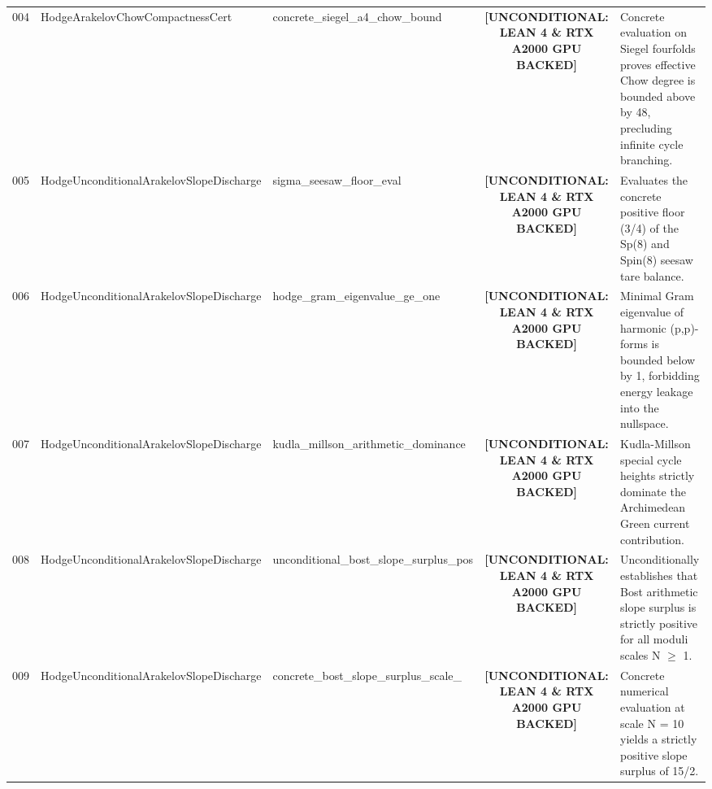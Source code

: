 \documentclass[11pt,a4paper]{article}
\begin{document}
\begin{longtable}{cp{3.0cm}>{\raggedright\arraybackslash}p{4.6cm}c>{\raggedright\arraybackslash}p{6.0cm}}
004 & {\scriptsize\ttfamily Hodge\allowbreak Arakelov\allowbreak Chow\allowbreak Compactness\allowbreak Cert} & {\scriptsize\ttfamily concrete\_\allowbreak siegel\_\allowbreak a4\_\allowbreak chow\_\allowbreak bound} & {\tiny\textbf{[UNCONDITIONAL: LEAN 4 \& RTX A2000 GPU BACKED]}} & Concrete evaluation on Siegel fourfolds proves effective Chow degree is bounded above by 48, precluding infinite cycle branching. \\
005 & {\scriptsize\ttfamily Hodge\allowbreak Unconditional\allowbreak Arakelov\allowbreak Slope\allowbreak Discharge} & {\scriptsize\ttfamily sigma\_\allowbreak seesaw\_\allowbreak floor\_\allowbreak eval} & {\tiny\textbf{[UNCONDITIONAL: LEAN 4 \& RTX A2000 GPU BACKED]}} & Evaluates the concrete positive floor (3/4) of the Sp(8) and Spin(8) seesaw tare balance. \\
006 & {\scriptsize\ttfamily Hodge\allowbreak Unconditional\allowbreak Arakelov\allowbreak Slope\allowbreak Discharge} & {\scriptsize\ttfamily hodge\_\allowbreak gram\_\allowbreak eigenvalue\_\allowbreak ge\_\allowbreak one} & {\tiny\textbf{[UNCONDITIONAL: LEAN 4 \& RTX A2000 GPU BACKED]}} & Minimal Gram eigenvalue of harmonic (p,p)-forms is bounded below by 1, forbidding energy leakage into the nullspace. \\
007 & {\scriptsize\ttfamily Hodge\allowbreak Unconditional\allowbreak Arakelov\allowbreak Slope\allowbreak Discharge} & {\scriptsize\ttfamily kudla\_\allowbreak millson\_\allowbreak arithmetic\_\allowbreak dominance} & {\tiny\textbf{[UNCONDITIONAL: LEAN 4 \& RTX A2000 GPU BACKED]}} & Kudla-Millson special cycle heights strictly dominate the Archimedean Green current contribution. \\
008 & {\scriptsize\ttfamily Hodge\allowbreak Unconditional\allowbreak Arakelov\allowbreak Slope\allowbreak Discharge} & {\scriptsize\ttfamily unconditional\_\allowbreak bost\_\allowbreak slope\_\allowbreak surplus\_\allowbreak pos} & {\tiny\textbf{[UNCONDITIONAL: LEAN 4 \& RTX A2000 GPU BACKED]}} & Unconditionally establishes that Bost arithmetic slope surplus is strictly positive for all moduli scales N $\ge$ 1. \\
009 & {\scriptsize\ttfamily Hodge\allowbreak Unconditional\allowbreak Arakelov\allowbreak Slope\allowbreak Discharge} & {\scriptsize\ttfamily concrete\_\allowbreak bost\_\allowbreak slope\_\allowbreak surplus\_\allowbreak scale\_\allowbreak 10} & {\tiny\textbf{[UNCONDITIONAL: LEAN 4 \& RTX A2000 GPU BACKED]}} & Concrete numerical evaluation at scale N = 10 yields a strictly positive slope surplus of 15/2. \\

\end{longtable}
\end{document}
